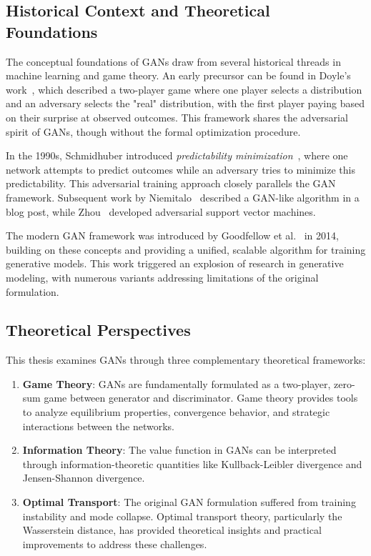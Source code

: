 \subsection{Historical Context and Theoretical Foundations}

The conceptual foundations of GANs draw from several historical threads in machine learning and game theory. An early precursor can be found in Doyle's work~\cite{ref:doyle}, which described a two-player game where one player selects a distribution and an adversary selects the "real" distribution, with the first player paying based on their surprise at observed outcomes. This framework shares the adversarial spirit of GANs, though without the formal optimization procedure.

In the 1990s, Schmidhuber introduced \textit{predictability minimization}~\cite{ref:schmidhuber-1992,ref:schmidhuber-2018}, where one network attempts to predict outcomes while an adversary tries to minimize this predictability. This adversarial training approach closely parallels the GAN framework. Subsequent work by Niemitalo~\cite{ref:niemitalo-2010} described a GAN-like algorithm in a blog post, while Zhou~\cite{ref:zhou-2012} developed adversarial support vector machines.

The modern GAN framework was introduced by Goodfellow et al.~\cite{ref:goodfellow-original} in 2014, building on these concepts and providing a unified, scalable algorithm for training generative models. This work triggered an explosion of research in generative modeling, with numerous variants addressing limitations of the original formulation.

\subsection{Theoretical Perspectives}

This thesis examines GANs through three complementary theoretical frameworks:

\begin{enumerate}
  \item \textbf{Game Theory}: GANs are fundamentally formulated as a two-player, zero-sum game between generator and discriminator. Game theory provides tools to analyze equilibrium properties, convergence behavior, and strategic interactions between the networks.
  
  \item \textbf{Information Theory}: The value function in GANs can be interpreted through information-theoretic quantities like Kullback-Leibler divergence and Jensen-Shannon divergence.
  
  \item \textbf{Optimal Transport}: The original GAN formulation suffered from training instability and mode collapse. Optimal transport theory, particularly the Wasserstein distance, has provided theoretical insights and practical improvements to address these challenges.
\end{enumerate}

